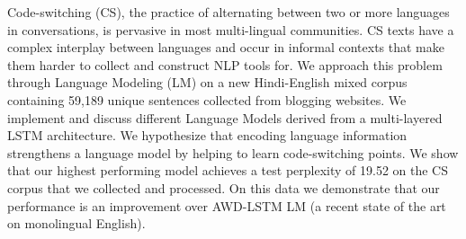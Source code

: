Code-switching (CS), the practice of alternating between two or more languages in conversations, is  pervasive in most multi-lingual communities. CS texts have a complex interplay between languages and occur in informal contexts that make them harder to collect and construct NLP tools for. We approach this problem through Language Modeling (LM) on a new Hindi-English mixed corpus containing 59,189 unique sentences collected from blogging websites. We implement and discuss different Language Models derived from a multi-layered LSTM architecture. We hypothesize that encoding language information strengthens a language model by helping to learn code-switching points. We show that our highest performing model achieves a test perplexity of 19.52 on the CS corpus that we collected and processed. On this data we demonstrate that our performance is an improvement over AWD-LSTM LM (a recent state of the art on monolingual English).
